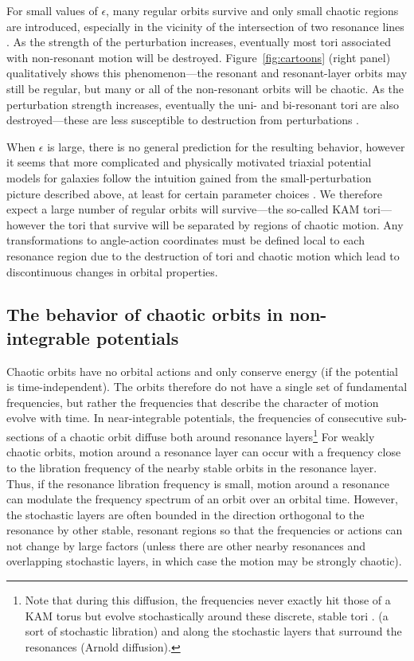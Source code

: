 For small values of $\epsilon$, many regular orbits survive and only small chaotic regions are introduced, especially in the vicinity of the intersection of two resonance lines \citep[commonly referred to as `resonance overlap'; see][]{chirikov60}. As the strength of the perturbation increases, eventually most tori associated with non-resonant motion will be destroyed. Figure~\ref{fig:cartoons} (right panel) qualitatively shows this phenomenon---the resonant and resonant-layer orbits may still be regular, but many or all of the non-resonant orbits will be chaotic. As the perturbation strength increases, eventually the uni- and bi-resonant tori are also destroyed---these are less susceptible to destruction from perturbations \cite[for a more quantitative illustration of this transition from integrability to global chaos, see Figure~9 in][]{valluri98}.

When $\epsilon$ is large, there is no general prediction for the resulting behavior, however it seems that more complicated and physically motivated triaxial potential models for galaxies follow the intuition gained from the small-perturbation picture described above, at least for certain parameter choices \citep[e.g.,][]{valluri98, merritt99}. We therefore expect a large number of regular orbits will survive---the so-called KAM tori---however the tori that survive will be separated by regions of chaotic motion. Any transformations to angle-action coordinates must be defined local to each resonance region due to the destruction of tori and chaotic motion which lead to discontinuous changes in orbital properties.

\subsection{The behavior of chaotic orbits in non-integrable potentials}\label{sec:behavior-chaotic}

Chaotic orbits have no orbital actions and only conserve energy (if the potential is time-independent). The orbits therefore do not have a single set of fundamental frequencies, but rather the frequencies that describe the character of motion evolve with time. In near-integrable potentials, the frequencies of consecutive sub-sections of a chaotic orbit diffuse both around resonance layers\footnote{Note that during this diffusion, the frequencies never exactly hit those of a KAM torus but evolve stochastically around these discrete, stable tori \citep[cf. Figure 2 in][]{laskar99}. (a sort of stochastic libration) and along the stochastic layers that surround the resonances (Arnold diffusion).} For weakly chaotic orbits, motion around a resonance layer can occur with a frequency close to the libration frequency of the nearby stable orbits in the resonance layer. Thus, if the resonance libration frequency is small, motion around a resonance can modulate the frequency spectrum of an orbit over an orbital time. However, the stochastic layers are often bounded in the direction orthogonal to the resonance by other stable, resonant regions so that the frequencies or actions can not change by large factors (unless there are other nearby resonances and overlapping stochastic layers, in which case the motion may be strongly chaotic). 

